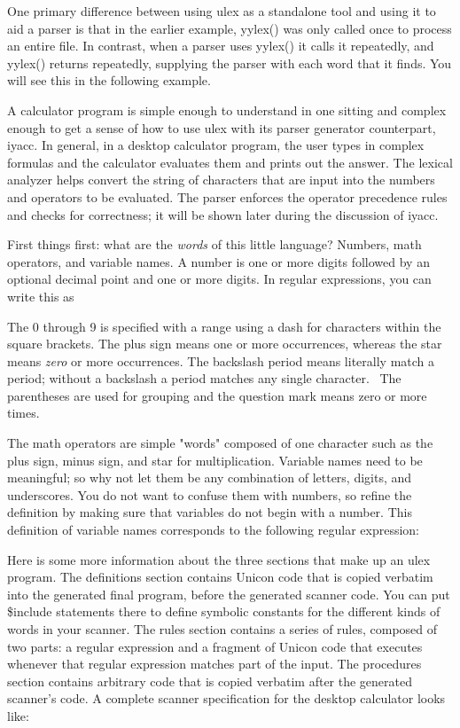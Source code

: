 One primary difference between using \textsf{ulex} as a standalone tool and
using it to aid a parser is that in the earlier example, \textsf{yylex()} was
only called once to process an entire file. In contrast, when a parser uses
\textsf{yylex()} it calls it repeatedly, and \textsf{yylex()} returns
repeatedly, supplying the parser with each word that it finds. You will see
this in the following example.

A calculator program is simple enough to understand in one sitting and
complex enough to get a sense of how to use \textsf{ulex} with its
parser generator counterpart, \textsf{iyacc}. In general, in a desktop
calculator program, the user types in complex formulas and the
calculator evaluates them and prints out the answer.  The lexical
analyzer helps convert the string of characters that are input into
the numbers and operators to be evaluated.  The parser enforces the
operator precedence rules and checks for correctness; it will be shown
later during the discussion of \textsf{iyacc}.

First things first: what are the \emph{words} of this little language?
Numbers, math operators, and variable names. A number is one or more
digits followed by an optional decimal point and one or more digits. In
regular expressions, you can write this as


The 0 through 9 is specified with a range using a dash for characters
within the square brackets. The plus sign means one or more
occurrences, whereas the star means \textit{zero} or more occurrences.
The backslash period means literally match a period; without a
backslash a period matches any single character. \ The parentheses are
used for grouping and the question mark means zero or more times.

The math operators are simple "words"
composed of one character such as the plus sign, minus sign, and star
for multiplication. Variable names need to be meaningful; so why not
let them be any combination of letters, digits, and underscores. You do
not want to confuse them with numbers, so refine the definition by
making sure that variables do not begin with a number. This definition
of variable names corresponds to the following regular expression: 

\iconcode{
[a-zA-Z\_][a-zA-Z0-9\_]*}

Here is some more information about the three sections that make up an
\textsf{ulex} program. The definitions section contains Unicon code
that is copied verbatim into the generated final program, before the
generated scanner code. You can put \textsf{\$include} statements there
to define symbolic constants for the different kinds of words in your
scanner. The rules section contains a series of rules, composed of two
parts: a regular expression and a fragment of Unicon code that executes
whenever that regular expression matches part of the input. The
procedures section contains arbitrary code that is copied verbatim
after the generated scanner's code. A complete scanner
specification for the desktop calculator looks like:

